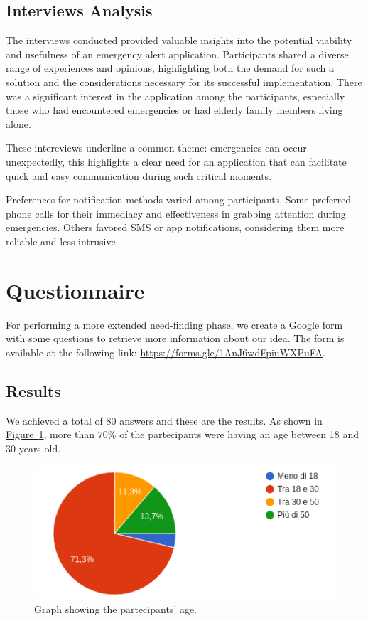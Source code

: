 \documentclass[12pt]{article}
\begin{document}
\subsection{Interviews Analysis}
The interviews conducted provided valuable insights into the potential 
viability and usefulness of an emergency alert application. Participants 
shared a diverse range of experiences and opinions, highlighting both the
demand for such a solution and the considerations necessary for its 
successful implementation. There was a significant interest in the 
application among the participants, especially those who had encountered 
emergencies or had elderly family members living alone.

These intereviews underline a common theme: emergencies can occur 
unexpectedly, this highlights a clear need for an application 
that can facilitate quick and easy communication during such critical 
moments.

Preferences for notification methods varied among participants. 
Some preferred phone calls for their immediacy and effectiveness in 
grabbing attention during emergencies. Others favored SMS or app 
notifications, considering them more reliable and less intrusive. 

\section{Questionnaire}
For performing a more extended need-finding phase, we create a Google form 
with some questions to retrieve more information about our idea. The form 
is available at the following link: \url{https://forms.gle/1AnJ6wdFpiuWXPuFA}.

\subsection{Results}
We achieved a total of 80 answers and these are the results. As shown in 
\hyperref[fig:age]{Figure~\ref*{fig:age}}, more than $70\%$ of the partecipants
were having an age between 18 and 30 years old. 

\begin{figure}[ht]
    \centering
    \includegraphics[width=.5\textwidth]{Images/age.png}
    \caption{Graph showing the partecipants' age.}
    \label{fig:age}
\end{figure}
\end{document}
